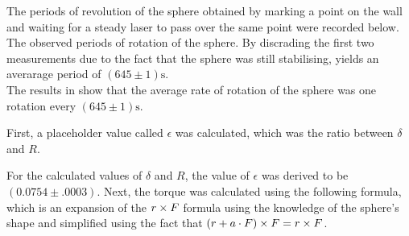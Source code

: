 \begin{paper}
The periods of revolution of the sphere obtained by marking a point on the wall and waiting for a steady laser to pass over the same point were recorded below.\\

{The observed periods of rotation of the sphere. By discrading the first two measurements due to the fact that the sphere was still stabilising, yields an averarage period of $(645\pm1)\si{\second}$.}\\

The results in \figT show that the average rate of rotation of the sphere was one rotation every $(645\pm1)\si{\second}$.


First, a placeholder value called $\epsilon$ was calculated, which was the ratio between $\delta$ and $R$.

\begin{paperwhere}
\end{paperwhere}

For the calculated values of $\delta$ and $R$, the value of $\epsilon$ was derived to be $(0.0754\pm.0003)$.
Next, the torque was calculated using the following formula, which is an expansion of the $r\times F$ formula using the knowledge of the sphere's shape and simplified using the fact that $(r+a\cdot F)\times F=r\times F$.


\end{paper}
